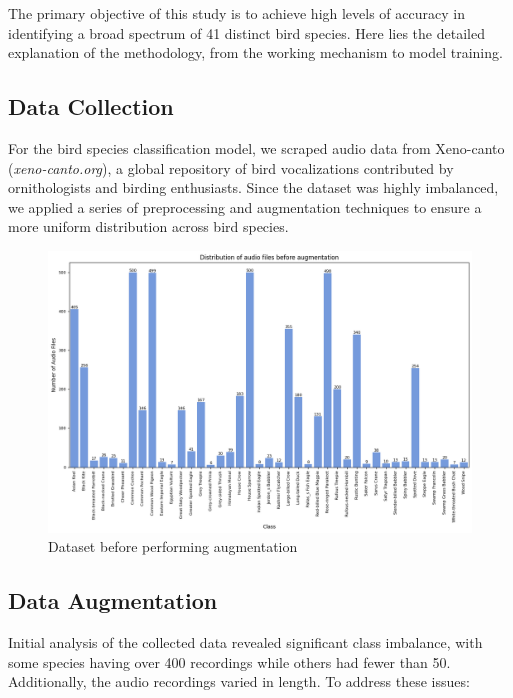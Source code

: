         The primary objective of this study is to achieve high levels of accuracy in
        identifying a broad spectrum of 41 distinct bird species. Here lies the
        detailed explanation of the methodology, from the working mechanism to model
        training.
        \subsection{Data Collection}
        For the bird species classification model, we scraped audio data from Xeno-canto
        (\textit{xeno-canto.org}), a global repository of bird vocalizations
        contributed by ornithologists and birding enthusiasts. Since the dataset was
        highly imbalanced, we applied a series of preprocessing and augmentation
        techniques to ensure a more uniform distribution across bird species.
        \begin{figure}[h!]
            \centering
            \includegraphics[width=1\textwidth]{images/before_augmentation.png}
            \caption{Dataset before performing augmentation}
            \label{fig:visualization}
        \end{figure}
        
        \subsection{Data Augmentation}
        Initial analysis of the collected data revealed significant class imbalance,
        with some species having over 400 recordings while others had fewer than 50.
        Additionally, the audio recordings varied in length. To address these issues:
        

